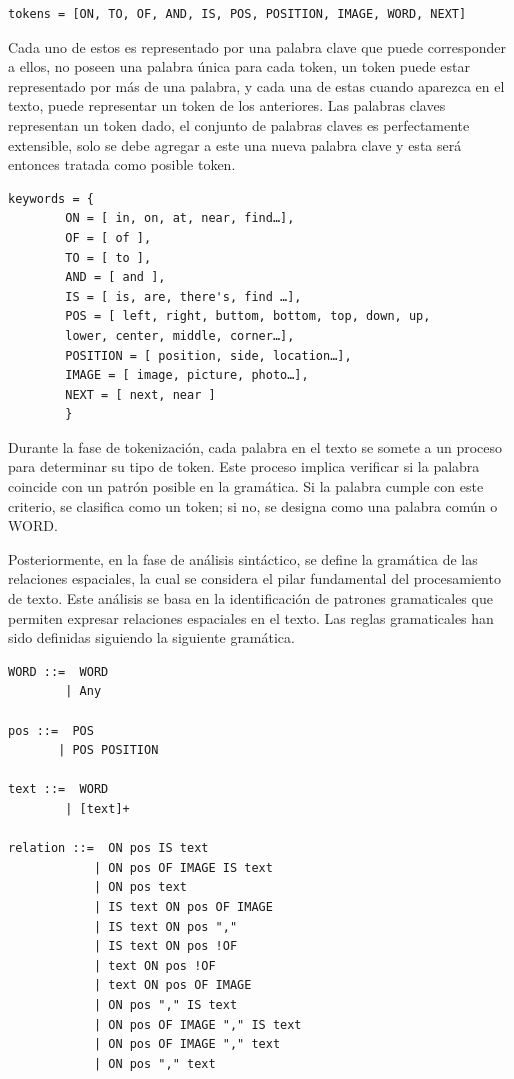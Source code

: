 \begin{verbatim}
tokens = [ON, TO, OF, AND, IS, POS, POSITION, IMAGE, WORD, NEXT]
\end{verbatim}

Cada uno de estos es representado por una palabra clave que puede corresponder a ellos, no poseen una palabra única para cada token, un token puede estar representado por más de una palabra, y cada una de estas cuando aparezca en el texto, puede representar un token de los anteriores. Las palabras claves representan un token dado, el conjunto de palabras claves es perfectamente extensible, solo se debe agregar a este una nueva palabra clave y esta ser\'a entonces tratada como posible token.

\begin{verbatim}
keywords = {
        ON = [ in, on, at, near, find…],
        OF = [ of ],
        TO = [ to ],
        AND = [ and ],
        IS = [ is, are, there's, find …],
        POS = [ left, right, buttom, bottom, top, down, up, 
        lower, center, middle, corner…],
        POSITION = [ position, side, location…],
        IMAGE = [ image, picture, photo…],
        NEXT = [ next, near ]
        }
\end{verbatim}

Durante la fase de tokenización, cada palabra en el texto se somete a un proceso para determinar su tipo de token. Este proceso implica verificar si la palabra coincide con un patrón posible en la gramática. Si la palabra cumple con este criterio, se clasifica como un token; si no, se designa como una palabra común o WORD.

Posteriormente, en la fase de análisis sintáctico, se define la gramática de las relaciones espaciales, la cual se considera el pilar fundamental del procesamiento de texto. Este análisis se basa en la identificación de patrones gramaticales que permiten expresar relaciones espaciales en el texto. Las reglas gramaticales han sido definidas siguiendo la siguiente gram\'atica.
 
\begin{verbatim}
WORD ::=  WORD
        | Any
    
pos ::=  POS
       | POS POSITION 

text ::=  WORD
        | [text]+
        
relation ::=  ON pos IS text
            | ON pos OF IMAGE IS text
            | ON pos text
            | IS text ON pos OF IMAGE
            | IS text ON pos ","
            | IS text ON pos !OF
            | text ON pos !OF
            | text ON pos OF IMAGE
            | ON pos "," IS text
            | ON pos OF IMAGE "," IS text
            | ON pos OF IMAGE "," text
            | ON pos "," text
\end{verbatim}

